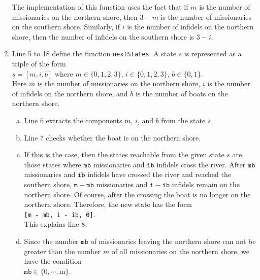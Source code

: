 \begin{enumerate}
      The implementation of this function uses the fact that if $m$ is the number of missionaries on
      the northern shore, then $3-m$ is the number of missionaries on the southern shore.  Similarly,
      if $i$ is the number of infidels on the northern shore, then the number of infidels on the
      southern shore is $3 - i$.
\item Line 5 to 18 define the function \texttt{nextStates}.  A state $s$ is represented as a triple of
      the form
      \\[0.2cm]
      \hspace*{1.3cm}
      $s = [m, i, b]$ \quad where $m \in \{0,1,2,3\}$, $i \in \{0,1,2,3\}$, $b \in\{0,1\}$.
      \\[0.2cm]
      Here $m$ is the number of missionaries on the northern shore, $i$ is the number of infidels on
      the northern shore, and $b$ is the number of boats on the northern shore.
      \begin{enumerate}[(a)]
      \item Line 6 extracts the components $m$, $i$, and $b$ from the state $s$.
      \item Line 7 checks whether the boat is on the northern shore.
      \item If this is the case,  then the states reachable from the given state $s$ are those
            states where $\mathtt{mb}$ missionaries and $\mathtt{ib}$ infidels cross the river.
            After $\mathtt{mb}$ missionaries and $\mathtt{ib}$ infidels have crossed the river and
            reached the southern shore, $\mathtt{m} - \mathtt{mb}$ missionaries and $\mathtt{i} - \mathtt{ib}$ infidels
            remain on the northern shore.  Of course, after the crossing the boat is no longer on the
            northern shore.  Therefore, the new state has the form
            \\[0.2cm]
            \hspace*{1.3cm}
            \texttt{[m - mb, i - ib, 0]}.
            \\[0.2cm]
            This explains line 8.
      \item Since the number $\mathtt{mb}$ of missionaries leaving the northern shore can not be greater
            than the number $m$ of all missionaries on the northern shore, we have the condition
            \\[0.2cm]
            \hspace*{1.3cm}
            $\mathtt{mb} \in \{0,\cdots,\mathrm{m}\}$.
            \\[0.2cm]

\end{enumerate}
\end{enumerate}
